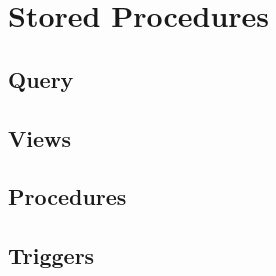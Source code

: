 \section{Stored Procedures}

\subsection{Query}

\subsection{Views}

\subsection{Procedures}

\subsection{Triggers}